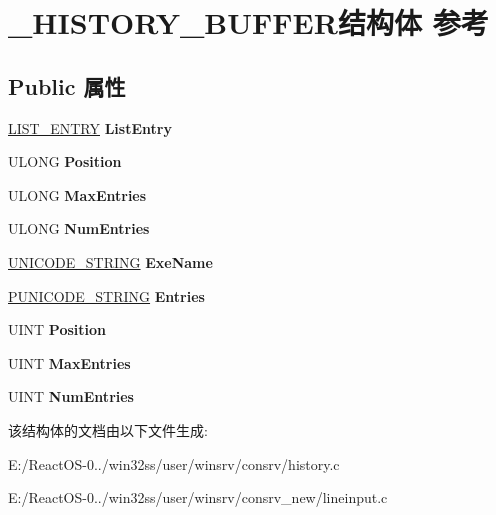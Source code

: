 \hypertarget{struct___h_i_s_t_o_r_y___b_u_f_f_e_r}{}\section{\+\_\+\+H\+I\+S\+T\+O\+R\+Y\+\_\+\+B\+U\+F\+F\+E\+R结构体 参考}
\label{struct___h_i_s_t_o_r_y___b_u_f_f_e_r}
\subsection*{Public 属性}
\begin{DoxyCompactItemize}
\item 
\mbox{\label{struct___h_i_s_t_o_r_y___b_u_f_f_e_r_a37d95b166bdbe6bd28d91ff071f16587}} 
\hyperlink{struct___l_i_s_t___e_n_t_r_y}{L\+I\+S\+T\+\_\+\+E\+N\+T\+RY} {\bfseries List\+Entry}
\item 
\mbox{\label{struct___h_i_s_t_o_r_y___b_u_f_f_e_r_af552ce3e2e223b6f7e4c6cd8fc26330f}} 
U\+L\+O\+NG {\bfseries Position}
\item 
\mbox{\label{struct___h_i_s_t_o_r_y___b_u_f_f_e_r_af01b277b301fd950d30531fca1a7c0d5}} 
U\+L\+O\+NG {\bfseries Max\+Entries}
\item 
\mbox{\label{struct___h_i_s_t_o_r_y___b_u_f_f_e_r_ac9c391aebd4e581b68b026570480a2e8}} 
U\+L\+O\+NG {\bfseries Num\+Entries}
\item 
\mbox{\label{struct___h_i_s_t_o_r_y___b_u_f_f_e_r_a465184b5695453b4f41b49e0d83e94f3}} 
\hyperlink{struct___u_n_i_c_o_d_e___s_t_r_i_n_g}{U\+N\+I\+C\+O\+D\+E\+\_\+\+S\+T\+R\+I\+NG} {\bfseries Exe\+Name}
\item 
\mbox{\label{struct___h_i_s_t_o_r_y___b_u_f_f_e_r_a440808659047f6d107b7f9aedcfd7962}} 
\hyperlink{struct___u_n_i_c_o_d_e___s_t_r_i_n_g}{P\+U\+N\+I\+C\+O\+D\+E\+\_\+\+S\+T\+R\+I\+NG} {\bfseries Entries}
\item 
\mbox{\label{struct___h_i_s_t_o_r_y___b_u_f_f_e_r_a3c4286d549f7dbd446e402b704055514}} 
U\+I\+NT {\bfseries Position}
\item 
\mbox{\label{struct___h_i_s_t_o_r_y___b_u_f_f_e_r_a147a1dfe842ec7a0948cbc6ef87384be}} 
U\+I\+NT {\bfseries Max\+Entries}
\item 
\mbox{\label{struct___h_i_s_t_o_r_y___b_u_f_f_e_r_a1a79ffa71c241d1ff1596e01aa97e60b}} 
U\+I\+NT {\bfseries Num\+Entries}
\end{DoxyCompactItemize}


该结构体的文档由以下文件生成\+:\begin{DoxyCompactItemize}
\item 
E\+:/\+React\+O\+S-\/0../win32ss/user/winsrv/consrv/history.\+c\item 
E\+:/\+React\+O\+S-\/0../win32ss/user/winsrv/consrv\+\_\+new/lineinput.\+c\end{DoxyCompactItemize}
